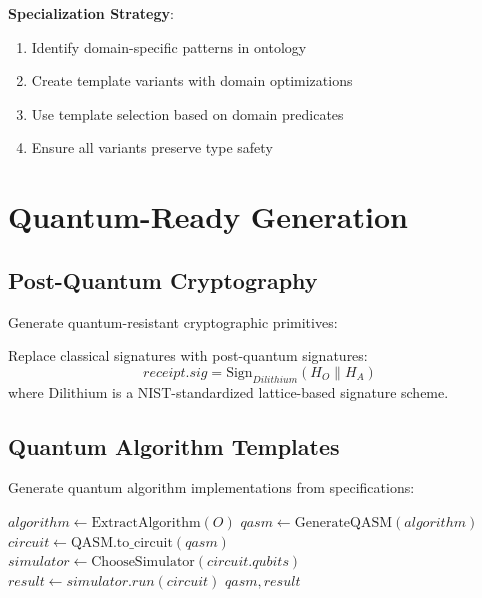 \textbf{Specialization Strategy}:
\begin{enumerate}
    \item Identify domain-specific patterns in ontology
    \item Create template variants with domain optimizations
    \item Use template selection based on domain predicates
    \item Ensure all variants preserve type safety
\end{enumerate}

\section{Quantum-Ready Generation}

\subsection{Post-Quantum Cryptography}

Generate quantum-resistant cryptographic primitives:

\begin{definition}
    Replace classical signatures with post-quantum signatures:
    \begin{equation}
        receipt.sig = \text{Sign}_{Dilithium}(H_O \| H_A)
    \end{equation}
    where Dilithium is a NIST-standardized lattice-based signature scheme.
\end{definition}

\subsection{Quantum Algorithm Templates}

Generate quantum algorithm implementations from specifications:

\begin{algorithm}
\caption{Quantum Algorithm Generation}
\begin{algorithmic}[1]
    \State $algorithm \gets \text{ExtractAlgorithm}(O)$
    \State $qasm \gets \text{GenerateQASM}(algorithm)$ 
    \State $circuit \gets \text{QASM.to\_circuit}(qasm)$
    \State $simulator \gets \text{ChooseSimulator}(circuit.qubits)$
    \State $result \gets simulator.run(circuit)$
    \State \Return $qasm, result$
\EndProcedure
\end{algorithmic}
\end{algorithm}

